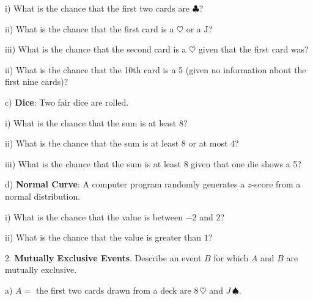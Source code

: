 \documentclass[10pt]{article}
\begin{document}
\hspace{20pt} i) What is the chance that the first two cards are $\clubsuit$?
\vspace{.5in}

\hspace{20pt} ii) What is the chance that the first card is a $\heartsuit$ or a J?
\vspace{.45in}

\hspace{20pt} iii) What is the chance that the second card is a $\heartsuit$ given that the first card was?
\vspace{.5in}

\hspace{20pt} ii) What is the chance that the 10th card is a 5 (given no information about 
  the first nine cards)?
\vspace{.5in}

\hspace{10pt} c) \textbf{Dice}: Two fair dice are rolled.

\hspace{20pt} i) What is the chance that the sum is at least 8?
\vspace{.5in}

\hspace{20pt} ii) What is the chance that the sum is at least 8 or at most 4?
\vspace{.45in}

\hspace{20pt} iii) What is the chance that the sum is at least 8 given that one die shows a 5?
\vspace{.5in}

\hspace{10pt} d) \textbf{Normal Curve}:
  A computer program randomly generates a $z$-score from a normal distribution.

\hspace{20pt} i) What is the chance that the value is between $-2$ and $2$?
\vspace{.4in}

\hspace{20pt} ii) What is the chance that the value is greater than $1$?
\vfill
\eject

2. \textbf{Mutually Exclusive Events}.  Describe an event $B$ for which $A$ and $B$ are 
mutually exclusive.

\hspace{10pt} a) $A=$ the first two cards drawn from a deck are $8\,\heartsuit$ and $J\,\spadesuit$.
\vspace{.3in}
\end{document}
